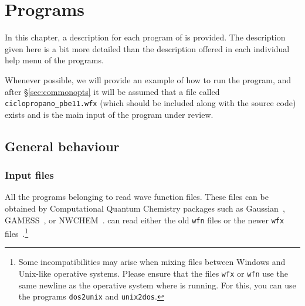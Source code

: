 
\newcommand{\wfexfile}{\texttt{ci\-clo\-pro\-pa\-no\_\-pbe\-63\-11.wfx}}
\newcommand{\progusg}[2]{\phantom{asd}\\\texttt{\phantom{MMM}\$#1 ciclopropano\_pbe6311.wfx #2}\\\phantom{asfd}\\}

\chapter{Programs}

In this chapter, a description for each program of \DTK{} is provided. The description given here is a bit more detailed than the description offered in each individual help menu of the programs.

Whenever possible, we will provide an example of how to run the program, and after \S\ref{sec:commonopts} it will be assumed that a file called
\wfexfile{} (which should be included along with the source code) exists and is the main input of the program under review.

\section{General behaviour}

\subsection{Input files}

All the programs belonging to \DTK{} read wave function files. These files can be obtained by Computational Quantum Chemistry packages such as Gaussian~\cite{bib:gaussian09}, GAMESS~\cite{bib:gamess}, or NWCHEM~\cite{bib:nwchem}. \DTK{} can read either the old \texttt{wfn} files or the newer \texttt{wfx} files~\cite{bib:webwfxformat}.\footnote{Some incompatibilities may arise when mixing files between Windows and Unix-like operative systems. Please ensure that the files \texttt{wfx} or \texttt{wfn} use the same newline as the operative system where \DTK{} is running. For this, you can use the programs \texttt{dos2unix} and \texttt{unix2dos}.}

